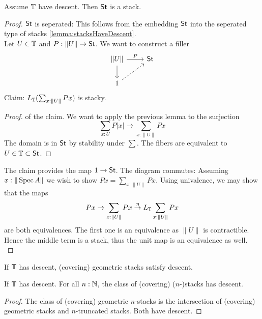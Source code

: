 \begin{theorem}
	Assume $\mathbb{T}$ have descent. Then $\mathsf{St}$ is a stack.
\end{theorem}
\begin{proof}
	$\mathsf{St}$ is seperated: This follows from the embedding $\mathsf{St}$ into the seperated type of stacks \ref{lemma:stacksHaveDescent}. \\
	Let $U \in \mathbb{T}$ and $P : \|U\| \to \mathsf{St}$. We want to construct a filler 
	\[\begin{tikzcd}
		{\| U\|} & \St \\
		1
		\arrow["P", from=1-1, to=1-2]
		\arrow[from=1-1, to=2-1]
		\arrow[dashed, from=2-1, to=1-2]
	\end{tikzcd}\]
	Claim: $L_{\mathbb{T}} (\sum_{x: \|U\|} P x)$ is stacky.
	\begin{proof} of the claim. We want to apply the previous lemma to the surjection 
		\[\sum_{x : U} P | x | \to \sum_{x : \| U\|} P x \]
		The domain is in $\mathsf{St}$ by stability under $\sum$. The fibers are equivalent to $U \in \mathbb{T} \subset \mathsf{St}$.				
	\end{proof}
	The claim provides the map $1 \to \mathsf{St}$. The diagram commutes: Assuming $x : \|\operatorname{Spec} A\|$ we wish to show $P x = \sum_{x: \|U\|} P x$. Using univalence, we may show that the maps 
	\[P x \to \sum_{x: \|U\|} P x \overset{\eta}{\to} L_{\mathbb{T}} \sum_{x: \|U\|} P x\]
	are both equivalences.
	The first one is an equivalence as $\|U\|$ is contractible. Hence the middle term is a stack, thus the unit map is an equivalence as well. \\
	
	
	
\end{proof}
\begin{corollary}
	If $\mathbb{T}$ has descent, (covering) geometric stacks satisfy descent.
\end{corollary}

\begin{corollary}
	If $\mathbb{T}$ has descent. For all $n : \mathbb{N} $, the class of (covering) ($n$-)stacks has descent.
\end{corollary}
\begin{proof}
	The class of (covering) geometric $n$-stacks is the intersection of (covering) geometric stacks and $n$-truncated stacks. Both have descent.
\end{proof}

